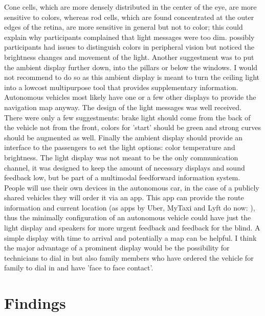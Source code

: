 Cone cells, which are more densely distributed in the center of the eye, are more sensitive to colors, whereas rod cells, which are found concentrated at the outer edges of the retina, are more sensitive in general but not to color; this could explain why participants complained that light messages were too dim. possibly participants had issues to distinguish colors in peripheral vision but noticed the brightness changes and movement of the light.  %
Another suggestment was to put the ambient display further down, into the pillars or below the windows. I would not recommend to do so as this ambient display is meant to turn the ceiling light into a lowcost multipurpose tool that provides supplementary information. Autonomous vehicles most likely have one or a few other displays to provide the navigation map anyway. 
The design of the light messages was well received. There were only a few suggestments: brake light should come from the back of the vehicle not from the front, colors for 'start' should be green and strong curves should be augmented as well. Finally the ambient display should provide an interface to the passengers to set the light options: color temperature and brightness. 
The light display was not meant to be the only communication channel, it was designed to keep the amount of necessary displays and sound feedback low, but be part of a multimodal feedforward information system. People will use their own devices in the autonomous car, in the case of a publicly shared vehicles they will order it via an app. This app can provide the route information and current location (as apps by Uber, MyTaxi and Lyft do now: ), thus the minimally configuration of an autonomous vehicle could have just the light display and speakers for more urgent feedback and feedback for the blind. A simple display with time to arrival and potentially a map can be helpful. I think the major advantage of a prominent display would be the possibility for technicians to dial in but also family members who have ordered the vehicle for family to dial in and have 'face to face contact'.

\section{Findings}
\label{sec:findings}
